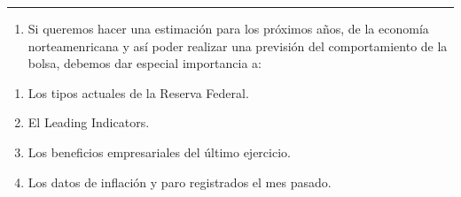 \documentclass[
  letterpaper,
  DIV=11,
  numbers=noendperiod]{scrreprt}
\providecommand{\tightlist}{%
  \setlength{\itemsep}{0pt}\setlength{\parskip}{0pt}}\usepackage{longtable,booktabs,array}
\begin{document}
\begin{center}\rule{0.5\linewidth}{0.5pt}\end{center}

\begin{enumerate}
\def\labelenumi{\arabic{enumi}.}
\setcounter{enumi}{48}
\tightlist
\item
  Si queremos hacer una estimación para los próximos años, de la
  economía norteamenricana y así poder realizar una previsión del
  comportamiento de la bolsa, debemos dar especial importancia a:
\end{enumerate}

\begin{enumerate}
\def\labelenumi{\alph{enumi}.}
\item
  Los tipos actuales de la Reserva Federal.
\item
  El Leading Indicators.
\item
  Los beneficios empresariales del último ejercicio.
\item
  Los datos de inflación y paro registrados el mes pasado.
\end{enumerate}
\end{document}
